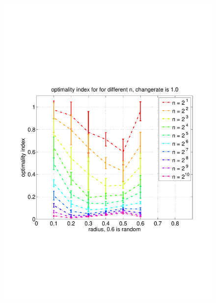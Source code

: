 \documentclass[11pt]{article}
\begin{document}
\begin{figure}
	\includegraphics[width=\linewidth]{../../code/data/2014_12_12_00_55_41/figure_6}
\end{figure}
\end{document}
